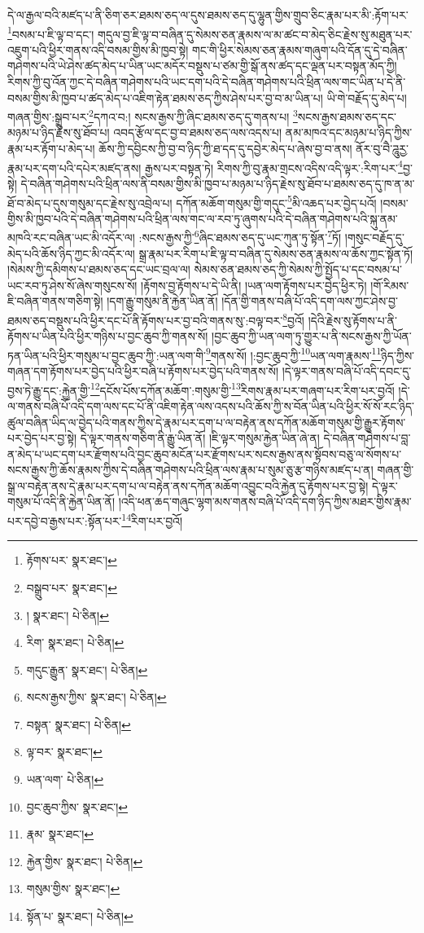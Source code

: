 དེ་ལ་རྒྱལ་བའི་མཛད་པ་ནི་ཅིག་ཅར་ཐམས་ཅད་ལ་དུས་ཐམས་ཅད་དུ་ལྷུན་གྱིས་གྲུབ་ཅིང་རྣམ་པར་མི་:རྟོག་པར་\footnote{རྟོགས་པར་  སྣར་ཐང་། }བསམ་པ་ཇི་ལྟ་བ་དང་། གདུལ་བྱ་ཇི་ལྟ་བ་བཞིན་དུ་སེམས་ཅན་རྣམས་ལ་མ་ཚང་བ་མེད་ཅིང་རྗེས་སུ་མཐུན་པར་འཇུག་པའི་ཕྱིར་གནས་འདི་བསམ་གྱིས་མི་ཁྱབ་སྟེ། གང་གི་ཕྱིར་སེམས་ཅན་རྣམས་གཞུག་པའི་དོན་དུ་དེ་བཞིན་གཤེགས་པའི་ཡེ་ཤེས་ཚད་མེད་པ་ཡིན་ཡང་མདོར་བསྡུས་པ་ཙམ་གྱི་སྒོ་ནས་ཚད་དང་ལྡན་པར་བསྟན་མོད་ཀྱི། རིགས་ཀྱི་བུ་འོན་ཀྱང་དེ་བཞིན་གཤེགས་པའི་ཡང་དག་པའི་དེ་བཞིན་གཤེགས་པའི་ཕྲིན་ལས་གང་ཡིན་པ་དེ་ནི་བསམ་གྱིས་མི་ཁྱབ་པ་ཚད་མེད་པ་འཇིག་རྟེན་ཐམས་ཅད་ཀྱིས་ཤེས་པར་བྱ་བ་མ་ཡིན་པ། ཡི་གེ་བརྗོད་དུ་མེད་པ། གཞན་གྱིས་:སྒྲུབ་པར་\footnote{བསྒྲུབ་པར་  སྣར་ཐང་། }དཀའ་བ:། སངས་རྒྱས་ཀྱི་ཞིང་ཐམས་ཅད་དུ་གནས་པ། \footnote{།    སྣར་ཐང་།  པེ་ཅིན། }སངས་རྒྱས་ཐམས་ཅད་དང་མཉམ་པ་ཉིད་རྗེས་སུ་ཐོབ་པ། འབད་རྩོལ་དང་བྱ་བ་ཐམས་ཅད་ལས་འདས་པ། ནམ་མཁའ་དང་མཉམ་པ་ཉིད་ཀྱིས་རྣམ་པར་རྟོག་པ་མེད་པ། ཆོས་ཀྱི་དབྱིངས་ཀྱི་བྱ་བ་ཉིད་ཀྱི་ཐ་དད་དུ་དབྱེར་མེད་པ་ཞེས་བྱ་བ་ནས། ནོར་བུ་བཻ་ཌཱུརྱ་རྣམ་པར་དག་པའི་དཔེར་མཛད་ནས། རྒྱས་པར་བསྟན་ཏེ། རིགས་ཀྱི་བུ་རྣམ་གྲངས་འདིས་འདི་ལྟར་:རིག་པར་\footnote{རིག་  སྣར་ཐང་།  པེ་ཅིན། }བྱ་སྟེ། དེ་བཞིན་གཤེགས་པའི་ཕྲིན་ལས་ནི་བསམ་གྱིས་མི་ཁྱབ་པ་མཉམ་པ་ཉིད་རྗེས་སུ་ཐོབ་པ་ཐམས་ཅད་དུ་ཁ་ན་མ་ཐོ་བ་མེད་པ་དུས་གསུམ་དང་རྗེས་སུ་འབྲེལ་པ། དཀོན་མཆོག་གསུམ་གྱི་གདུང་\footnote{གདུང་རྒྱུན་  སྣར་ཐང་།  པེ་ཅིན། }མི་འཆད་པར་བྱེད་པའོ། །བསམ་གྱིས་མི་ཁྱབ་པའི་དེ་བཞིན་གཤེགས་པའི་ཕྲིན་ལས་གང་ལ་རབ་ཏུ་ཞུགས་པའི་དེ་བཞིན་གཤེགས་པའི་སྐུ་ནམ་མཁའི་རང་བཞིན་ཡང་མི་འདོར་ལ། :སངས་རྒྱས་ཀྱི་\footnote{སངས་རྒྱས་ཀྱིས་  སྣར་ཐང་།  པེ་ཅིན། }ཞིང་ཐམས་ཅད་དུ་ཡང་ཀུན་ཏུ་སྟོན་\footnote{བསྟན་  སྣར་ཐང་།  པེ་ཅིན། }ཏོ། །གསུང་བརྗོད་དུ་མེད་པའི་ཆོས་ཉིད་ཀྱང་མི་འདོར་ལ། སྒྲ་རྣམ་པར་རིག་པ་ཇི་ལྟ་བ་བཞིན་དུ་སེམས་ཅན་རྣམས་ལ་ཆོས་ཀྱང་སྟོན་ཏོ། །སེམས་ཀྱི་དམིགས་པ་ཐམས་ཅད་དང་ཡང་བྲལ་ལ། སེམས་ཅན་ཐམས་ཅད་ཀྱི་སེམས་ཀྱི་སྤྱོད་པ་དང་བསམ་པ་ཡང་རབ་ཏུ་ཤེས་སོ་ཞེས་གསུངས་སོ། །རྟོགས་བྱ་རྟོགས་པ་དེ་ཡི་ནི། །ཡན་ལག་རྟོགས་པར་བྱེད་ཕྱིར་ཏེ། །གོ་རིམས་ཇི་བཞིན་གནས་གཅིག་སྟེ། །དག་རྒྱུ་གསུམ་ནི་རྐྱེན་ཡིན་ནོ། །དོན་གྱི་གནས་བཞི་པོ་འདི་དག་ལས་ཀྱང་ཤེས་བྱ་ཐམས་ཅད་བསྡུས་པའི་ཕྱིར་དང་པོ་ནི་རྟོགས་པར་བྱ་བའི་གནས་སུ་:བལྟ་བར་\footnote{ལྟ་བར་  སྣར་ཐང་། }བྱའོ། །དེའི་རྗེས་སུ་རྟོགས་པ་ནི་རྟོགས་པ་ཡིན་པའི་ཕྱིར་གཉིས་པ་བྱང་ཆུབ་ཀྱི་གནས་སོ། །བྱང་ཆུབ་ཀྱི་ཡན་ལག་ཏུ་གྱུར་པ་ནི་སངས་རྒྱས་ཀྱི་ཡོན་ཏན་ཡིན་པའི་ཕྱིར་གསུམ་པ་བྱང་ཆུབ་ཀྱི་:ཡན་ལག་གི་\footnote{ཡན་ལག་  པེ་ཅིན། }གནས་སོ། །:བྱང་ཆུབ་ཀྱི་\footnote{བྱང་ཆུབ་ཀྱིས་  སྣར་ཐང་། }ཡན་ལག་རྣམས་\footnote{རྣམ་  སྣར་ཐང་། }ཉིད་ཀྱིས་གཞན་དག་རྟོགས་པར་བྱེད་པའི་ཕྱིར་བཞི་པ་རྟོགས་པར་བྱེད་པའི་གནས་སོ། །དེ་ལྟར་གནས་བཞི་པོ་འདི་དབང་དུ་བྱས་ཏེ་རྒྱུ་དང་:རྐྱེན་གྱི་\footnote{རྐྱེན་གྱིས་  སྣར་ཐང་།  པེ་ཅིན། }དངོས་པོས་དཀོན་མཆོག་:གསུམ་གྱི་\footnote{གསུམ་གྱིས་  སྣར་ཐང་། }རིགས་རྣམ་པར་གཞག་པར་རིག་པར་བྱའོ། །དེ་ལ་གནས་བཞི་པོ་འདི་དག་ལས་དང་པོ་ནི་འཇིག་རྟེན་ལས་འདས་པའི་ཆོས་ཀྱི་ས་བོན་ཡིན་པའི་ཕྱིར་སོ་སོ་རང་ཉིད་ཚུལ་བཞིན་ཡིད་ལ་བྱེད་པའི་གནས་ཀྱིས་དེ་རྣམ་པར་དག་པ་ལ་བརྟེན་ནས་དཀོན་མཆོག་གསུམ་གྱི་རྒྱུར་རྟོགས་པར་བྱེད་པར་བྱ་སྟེ། དེ་ལྟར་གནས་གཅིག་ནི་རྒྱུ་ཡིན་ནོ། །ཇི་ལྟར་གསུམ་རྐྱེན་ཡིན་ཞེ་ན། དེ་བཞིན་གཤེགས་པ་བླ་ན་མེད་པ་ཡང་དག་པར་རྫོགས་པའི་བྱང་ཆུབ་མངོན་པར་རྫོགས་པར་སངས་རྒྱས་ནས་སྟོབས་བཅུ་ལ་སོགས་པ་སངས་རྒྱས་ཀྱི་ཆོས་རྣམས་ཀྱིས་དེ་བཞིན་གཤེགས་པའི་ཕྲིན་ལས་རྣམ་པ་སུམ་ཅུ་རྩ་གཉིས་མཛད་པ་ན། གཞན་གྱི་སྒྲ་ལ་བརྟེན་ནས་དེ་རྣམ་པར་དག་པ་ལ་བརྟེན་ནས་དཀོན་མཆོག་འབྱུང་བའི་རྐྱེན་དུ་རྟོགས་པར་བྱ་སྟེ། དེ་ལྟར་གསུམ་པོ་འདི་ནི་རྐྱེན་ཡིན་ནོ། །འདི་ཕན་ཆད་གཞུང་ལྷག་མས་གནས་བཞི་པོ་འདི་དག་ཉིད་ཀྱིས་མཐར་གྱིས་རྣམ་པར་དབྱེ་བ་རྒྱས་པར་:སྟོན་པར་\footnote{སྟོན་པ་  སྣར་ཐང་།  པེ་ཅིན། }རིག་པར་བྱའོ། 